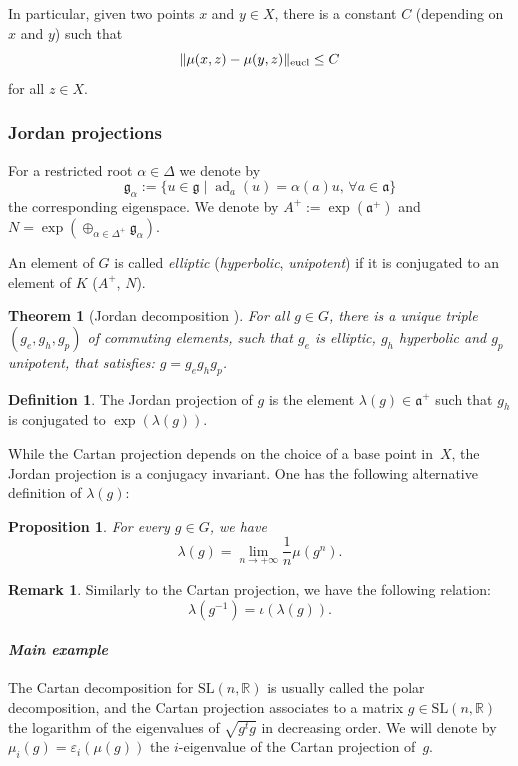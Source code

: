\documentclass[JEP,XML,SOM,Unicode,NoEqCountersInSection,NoFloatCountersInSection,published]{cedram}
\newtheorem{theorem}[theo]{Theorem}
\newtheorem{prop}[theo]{Proposition}
\theoremstyle{definition}
\newtheorem{defi}[theo]{Definition}
\newtheorem{rmk}[theo]{Remark}
\newcommand{\R}{\mathbb{R}}
\newcommand{\SL}{\mathrm{SL}}
\newcommand{\fa}{\mathfrak{a}}
\newcommand{\norm}[1]{\Vert #1 \Vert}
\DeclareMathOperator{\ad}{ad}
\let\epsilon\varepsilon
\let\op\iota
\begin{document}
In particular, given two points $x$ and $y\in X$, there is a constant $C$ (depending on $x$ and $y$) such that
\[\norm{\mu(x,z) - \mu(y,z)}_{\textup{eucl}} \leq C\]
for all $z\in X$.

\subsubsection{Jordan projections}
For a restricted root $\alpha\in \Delta$ we denote by
\[
\mathfrak{g}_\alpha := \{ u \in \mathfrak{g}\mid \ad_a(u) = \alpha(a) u , \, \forall a \in \fa \}
\]
the corresponding eigenspace. We denote by $A^+ := \exp(\fa^+)$ and $N=\exp(\oplus_{\alpha \in \Delta^+} \mathfrak{g}_\alpha) $.

An element of $G$ is called \emph{elliptic} (\resp \emph{hyperbolic}, \emph{unipotent}) if it is conjugated to an element of $K$ (\resp $A^+$, $N$).

\begin{theorem}[Jordan decomposition {\cite[Th.\,2.19.24]{helgason1978differential}}]
For all $g\in G$, there is a unique triple $(g_e, g_h, g_p)$ of commuting elements, such that $g_e$ is elliptic, $g_h$ hyperbolic and $g_p$ unipotent, that satisfies: $g=g_eg_hg_p$.
\end{theorem}

\begin{defi}
The Jordan projection of $g$ is the element $\lambda(g)\in \fa^+$ such that $g_h$ is conjugated to $\exp(\lambda(g))$.
\end{defi}
While the Cartan projection depends on the choice of a base point in~$X$, the Jordan projection is a conjugacy invariant. One has the following alternative definition of $\lambda(g)$:

\begin{prop}
For every $g\in G$, we have
\[\lambda(g) = \lim_{n\to +\infty} \frac{1}{n}\mu(g^n).\]
\end{prop}

\begin{rmk}
Similarly to the Cartan projection, we have the following relation:
\[\lambda(g^{-1}) = \op(\lambda(g)).\]
\end{rmk}

\paragraph{\textit{Main example}}

The Cartan decomposition for $\SL(n,\R)$ is usually called the polar decomposition, and the Cartan projection associates to a matrix $g\in \SL(n,\R)$ the logarithm of the eigenvalues of $\sqrt{g^t g}$ in decreasing order. We will denote by $\mu_i(g) = \epsilon_i(\mu(g))$ the $i$-eigenvalue of the Cartan projection of~$g$.
\end{document}
